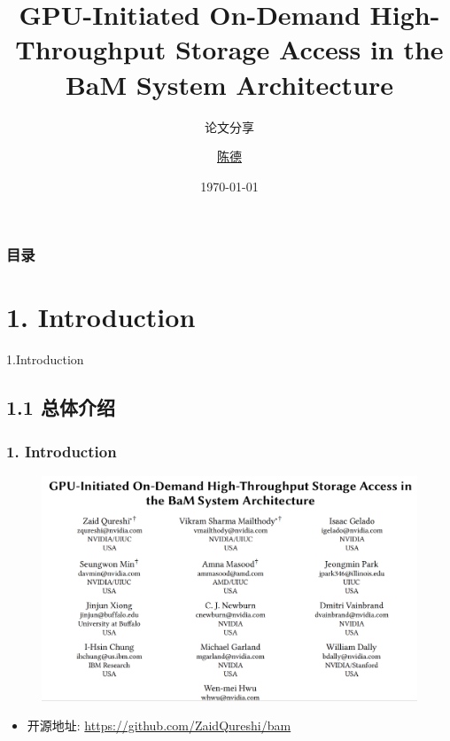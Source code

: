 \documentclass[10pt]{ctexbeamer}
\title[组会汇报]{GPU-Initiated On-Demand High-Throughput Storage Access in the BaM System Architecture}
\subtitle{论文分享}
\author[D.\,Chen]{\href{chende23@mails.ucas.ac.cn}{陈德}}
\date[\today]{\today}
\begin{document}
\begin{frame}[plain]
  \maketitle
\end{frame}

\begin{frame}[t]
  \frametitle{目录}
  \tableofcontents
\end{frame}

\section[1.Introduction]{1. Introduction}\label{sec:1}
\begin{frame}
  \begin{center}
    \Huge 1.Introduction
  \end{center}
\end{frame}
\subsection[1.1 General]{1.1 总体介绍}\label{subsec:1-1}

\begin{frame}
  \frametitle{1. Introduction}
  \begin{figure}
    \includegraphics[width=.5\textwidth, height=.5\textheight, keepaspectratio]{images/cover.png}
  \end{figure}
  \begin{itemize}
    \item 开源地址: \url{https://github.com/ZaidQureshi/bam}
  \end{itemize}
  \blfootnote{
    \printbibliography[heading=none,keyword=bam]
  }
  
\end{frame}
\end{document}
